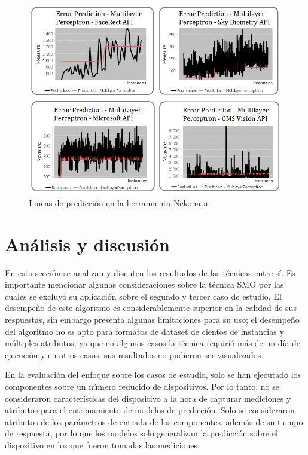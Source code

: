 \begin{figure}[H]
\begin{raggedright}
\includegraphics[scale=0.48]{images/response_face_lc}
\par\end{raggedright}

\caption{Lineas de predicción en la herramienta Nekonata \label{fig:Figura-comparativa-de-Multi}}
\end{figure}



\section{Análisis y discusión\label{sec:Analisis-y-discusi=0000F3n}}

En esta sección se analizan y discuten los resultados de las técnicas
entre sí. Es importante mencionar algunas consideraciones sobre la
técnica \ac{SMO} por las cuales se excluyó su aplicación sobre el
segundo y tercer caso de estudio. El desempeño de este algoritmo es
considerablemente superior en la calidad de sus respuestas, sin embargo
presenta algunas limitaciones para su uso; el desempeño del algoritmo
no es apto para formatos de dataset de cientos de instancias y múltiples
atributos, ya que en algunos casos la técnica requirió más de un día
de ejecución y en otros casos, sus resultados no pudieron ser visualizados.

En la evaluación del enfoque sobre los casos de estudio, solo se han
ejecutado los componentes sobre un número reducido de dispositivos.
Por lo tanto, no se consideraron características del dispositivo a
la hora de capturar mediciones y atributos para el entrenamiento de
modelos de predicción. Solo se consideraron atributos de los parámetros
de entrada de los componentes, además de su tiempo de respuesta, por
lo que los modelos solo generalizan la predicción sobre el dispositivo
en los que fueron tomadas las mediciones.

